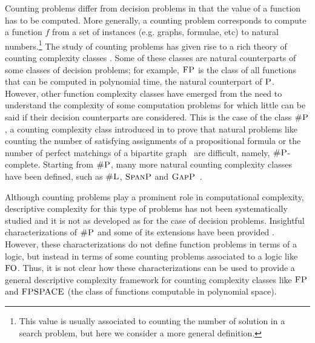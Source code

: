 Counting problems differ from decision problems in that the value of a function has to be computed.
More generally, a counting problem corresponds to compute a function $f$ from a set of instances (e.g. graphs, formulae, etc) to natural numbers.\footnote{This value is usually associated to counting the number of solution 
	in a search problem, but here we consider a more general definition.} 
The study of counting problems has given rise to a rich theory of counting complexity classes \cite{HV95,F97,arora2009computational}. Some of these classes are natural counterparts of some classes of decision problems; for example, $\text{\sc FP}$ 
is the class of all functions that can be computed in polynomial time, 
the natural counterpart of $\text{\sc P}$.
However, other function complexity classes have emerged from the need to understand the complexity of some computation problems for which little can be said if their decision counterparts are considered. This is the case of the class $\text{\sc \#P}$, a counting complexity class introduced in \cite{Valiant79} to prove that natural problems like counting the number of satisfying assignments of a propositional formula or the number of perfect matchings of a bipartite graph~\cite{Valiant79} are difficult, namely, $\text{\sc \#P}$-complete.
Starting from $\text{\sc \#P}$,
many more natural 
counting complexity classes have been defined, such as 
$\text{\sc \#L}$, $\text{\sc SpanP}$ and $\text{\sc GapP}$~\cite{HV95,F97}.

Although counting problems play a prominent role in computational complexity, descriptive complexity for this type of problems has not been systematically studied and it is not as developed as for the case of decision problems. Insightful characterizations of $\text{\sc \#P}$ and some of its extensions have been provided \cite{SalujaST95,ComptonG96}. However, these characterizations do not define function problems in terms of a logic, but instead in terms of some counting problems associated to a logic like ${\rm FO}$. Thus, it is not clear how these characterizations can be used to provide a general descriptive complexity framework for counting complexity classes like $\text{\sc FP}$ and $\text{\sc FPSPACE}$ (the class of functions computable in polynomial space). 

